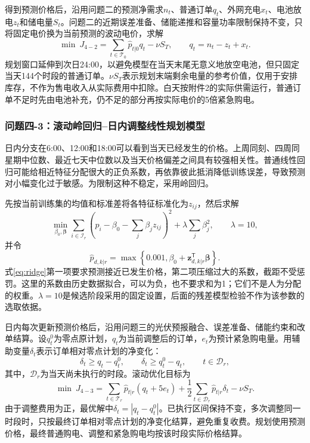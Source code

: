 \documentclass[11pt,a4paper]{article}
\begin{document}
得到预测价格后，沿用问题二的预测净需求$n_t$、普通订单$q_t$、外网充电$x_t$、电池放电$z_t$和储电量$S_t$。问题二的近期误差准备、储能递推和容量功率限制保持不变，只将固定电价换为当前预测的波动电价，求解
\begin{equation}
 \min\ J_{4-2}=\sum_{t\in\mathcal T_0}\widehat p_{t|0}q_t-\nu S_T,
 \qquad q_t=n_t-z_t+x_t.
 \label{eq:q42lp}
\end{equation}
规划窗口延伸到次日24:00，以避免模型在当天末尾无意义地放空电池，但只固定当天144个时段的普通订单。$\nu S_T$表示规划末端剩余电量的参考价值，仅用于安排库存，不作为售电收入从实际费用中扣除。白天按附件2的实际供需运行，普通订单不足时先由电池补充，仍不足的部分再按实际电价的5倍紧急购电。

\subsubsection{问题四-3：滚动岭回归--日内调整线性规划模型}

日内分支在6:00、12:00和18:00可以看到当天已经发生的价格。上周同刻、四周同星期中位数、最近七天中位数以及当天价格偏差之间具有较强相关性。普通线性回归可能给相近特征分配很大的正负系数，再依靠彼此抵消降低训练误差，导致预测对小幅变化过于敏感。为限制这种不稳定，采用岭回归。

先按当前训练集的均值和标准差将各特征标准化为$z_{ij}$，然后求解
\begin{equation}
 \min_{\beta_0,\boldsymbol\beta}
 \sum_{i\in\mathcal I_r}\left(p_i-\beta_0-\sum_j\beta_jz_{ij}\right)^2
 +\lambda\sum_j\beta_j^2,
 \qquad \lambda=10,
 \label{eq:ridge}
\end{equation}
并令
\begin{equation}
 \widehat p_{d,k|r}=\max\left\{0.001,\beta_0+
 \boldsymbol z_{d,k|r}^{\mathsf T}\boldsymbol\beta\right\}.
 \label{eq:ridgepredict}
\end{equation}
式\eqref{eq:ridge}第一项要求预测接近已发生价格，第二项压缩过大的系数，截距不受惩罚。这里的系数由历史数据拟合，可以为负，也不要求和为1；它们不是人为分配的权重。$\lambda=10$是候选阶段采用的固定设置，后面的残差模型检验不作为该参数的选取依据。

日内每次更新预测价格后，沿用问题三的光伏预报融合、误差准备、储能约束和改单结算。设$q_t^0$为零点原计划，$q_t$为当前调整后的订单，$e_t$为预计紧急购电量。用辅助变量$\delta_t$表示订单相对零点计划的净变化：
\begin{equation}
 \delta_t\ge q_t-q_t^0,\qquad \delta_t\ge q_t^0-q_t,
 \qquad t\in\mathcal D_r,
 \label{eq:delta}
\end{equation}
其中，$\mathcal D_r$为当天尚未执行的时段。滚动优化目标为
\begin{equation}
 \min\ J_{4-3}=\sum_{t\in\mathcal T_r}\widehat p_{t|r}(q_t+5e_t)
 +\frac12\sum_{t\in\mathcal D_r}\widehat p_{t|r}\delta_t-\nu S_T.
 \label{eq:q43lp}
\end{equation}
由于调整费用为正，最优解中$\delta_t=|q_t-q_t^0|$。已执行区间保持不变，多次调整同一时段时，只按最终订单相对零点计划的净变化结算，避免重复收费。规划使用预测价格，最终普通购电、调整和紧急购电均按该时段实际价格结算。
\end{document}
